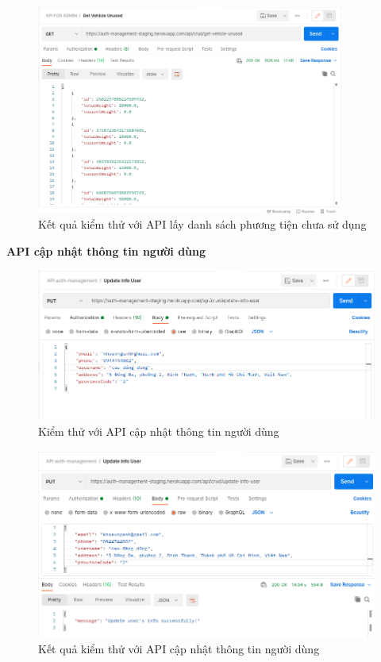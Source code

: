 		\begin{figure}[H]
			\includegraphics[width=0.9\textwidth]{Images/testing/API-get-vehicle-unused-result.png}
			\centering
			\linebreak
			\caption{Kết quả kiểm thử với API lấy danh sách phương tiện chưa sử dụng}
		\end{figure}
		
		\newpage
		\textbf{API cập nhật thông tin người dùng}
		
		\begin{figure}[H]
			\includegraphics[width=1\textwidth]{Images/testing/API-update-info-user.png}
			\centering
			\linebreak
			\caption{Kiểm thử với API cập nhật thông tin người dùng}
		\end{figure}
		
		\begin{figure}[H]
			\includegraphics[width=1\textwidth]{Images/testing/API-update-info-user-result.png}
			\centering
			\linebreak
			\caption{Kết quả kiểm thử với API cập nhật thông tin người dùng}
		\end{figure}
		
